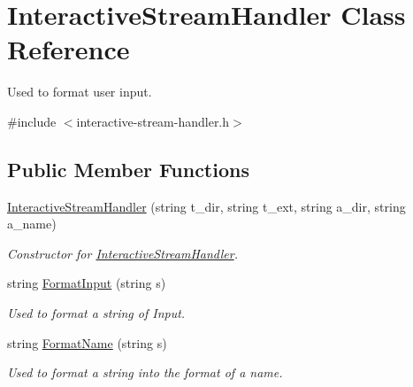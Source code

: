 \hypertarget{classInteractiveStreamHandler}{
\section{InteractiveStreamHandler Class Reference}
\label{classInteractiveStreamHandler}
}


Used to format user input.  




{\ttfamily \#include $<$interactive-\/stream-\/handler.h$>$}

\subsection*{Public Member Functions}
\begin{DoxyCompactItemize}
\item 
\hyperlink{classInteractiveStreamHandler_a84581012cff489309399cba0068975fd}{InteractiveStreamHandler} (string t\_\-dir, string t\_\-ext, string a\_\-dir, string a\_\-name)
\begin{DoxyCompactList}\small\item\em Constructor for \hyperlink{classInteractiveStreamHandler}{InteractiveStreamHandler}. \item\end{DoxyCompactList}\item 
string \hyperlink{classInteractiveStreamHandler_aa372b2a79eb1e88222fdae1f8d58b46b}{FormatInput} (string s)
\begin{DoxyCompactList}\small\item\em Used to format a string of Input. \item\end{DoxyCompactList}\item 
string \hyperlink{classInteractiveStreamHandler_a757903776017c997963b67a23c1a2a1e}{FormatName} (string s)
\begin{DoxyCompactList}\small\item\em Used to format a string into the format of a name. \item\end{DoxyCompactList}\end{DoxyCompactItemize}
